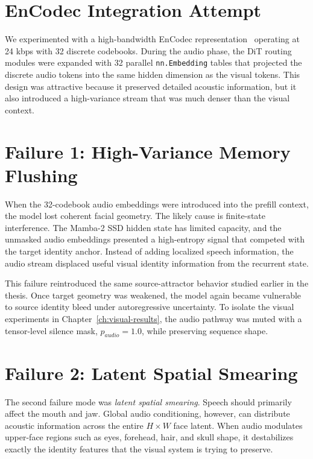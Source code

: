 \documentclass[12pt,letterpaper]{report}
\begin{document}
\section{EnCodec Integration Attempt}

We experimented with a high-bandwidth EnCodec representation~\cite{defossez2023high} operating at 24 kbps with 32 discrete codebooks. During the audio phase, the DiT routing modules were expanded with 32 parallel \texttt{nn.Embedding} tables that projected the discrete audio tokens into the same hidden dimension as the visual tokens. This design was attractive because it preserved detailed acoustic information, but it also introduced a high-variance stream that was much denser than the visual context.

\section{Failure 1: High-Variance Memory Flushing}

When the 32-codebook audio embeddings were introduced into the prefill context, the model lost coherent facial geometry. The likely cause is finite-state interference. The Mamba-2 SSD hidden state has limited capacity, and the unmasked audio embeddings presented a high-entropy signal that competed with the target identity anchor. Instead of adding localized speech information, the audio stream displaced useful visual identity information from the recurrent state.

This failure reintroduced the same source-attractor behavior studied earlier in the thesis. Once target geometry was weakened, the model again became vulnerable to source identity bleed under autoregressive uncertainty. To isolate the visual experiments in Chapter~\ref{ch:visual-results}, the audio pathway was muted with a tensor-level silence mask, $p_{audio}=1.0$, while preserving sequence shape.

\section{Failure 2: Latent Spatial Smearing}

The second failure mode was \textit{latent spatial smearing}. Speech should primarily affect the mouth and jaw. Global audio conditioning, however, can distribute acoustic information across the entire $H \times W$ face latent. When audio modulates upper-face regions such as eyes, forehead, hair, and skull shape, it destabilizes exactly the identity features that the visual system is trying to preserve.
\end{document}
